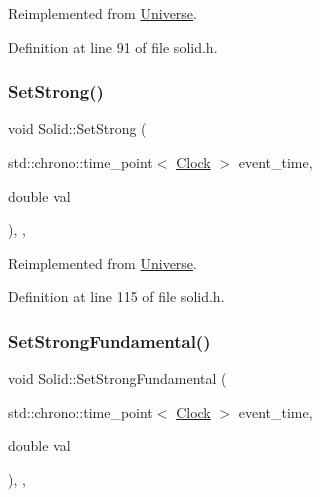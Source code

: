 Reimplemented from \hyperlink{class_universe_ae2ae1c3b3e4cde2c18f5f6a814761ec8}{Universe}.



Definition at line 91 of file solid.\+h.

\mbox{\label{class_solid_a478e15cdf15c5bb01cbcbd5f584ef83a}} 
\subsubsection{\texorpdfstring{Set\+Strong()}{SetStrong()}}
{\footnotesize\ttfamily void Solid\+::\+Set\+Strong (\begin{DoxyParamCaption}\item[{std\+::chrono\+::time\+\_\+point$<$ \hyperlink{universe_8h_a0ef8d951d1ca5ab3cfaf7ab4c7a6fd80}{Clock} $>$}]{event\+\_\+time,  }\item[{double}]{val }\end{DoxyParamCaption})\hspace{0.3cm}{\ttfamily [inline]}, {\ttfamily [final]}, {\ttfamily [virtual]}}



Reimplemented from \hyperlink{class_universe_a5946c8f3d4cda305f3ecd10df21a2f94}{Universe}.



Definition at line 115 of file solid.\+h.

\mbox{\label{class_solid_a4342786a7785b1a3816d20de02105bcf}} 
\subsubsection{\texorpdfstring{Set\+Strong\+Fundamental()}{SetStrongFundamental()}}
{\footnotesize\ttfamily void Solid\+::\+Set\+Strong\+Fundamental (\begin{DoxyParamCaption}\item[{std\+::chrono\+::time\+\_\+point$<$ \hyperlink{universe_8h_a0ef8d951d1ca5ab3cfaf7ab4c7a6fd80}{Clock} $>$}]{event\+\_\+time,  }\item[{double}]{val }\end{DoxyParamCaption})\hspace{0.3cm}{\ttfamily [inline]}, {\ttfamily [final]}, {\ttfamily [virtual]}}



